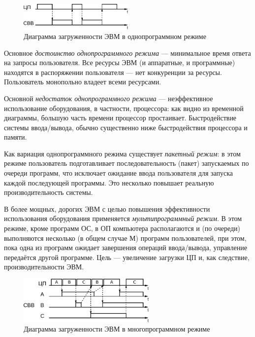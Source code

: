 \documentclass[unicode, 12pt, a4paper, oneside]{article}
\begin{document}
\begin{figure}[H]
\centering
\includegraphics[width=0.5\textwidth]{153_single.pdf}
\caption{Диаграмма загруженности ЭВМ в однопрограммном режиме}
\end{figure}

Основное \textit{достоинство однопрограммного режима} --- минимальное время ответа на запросы пользователя. Все ресурсы ЭВМ (и аппаратные, и программные) находятся в распоряжении пользователя --- нет конкуренции за ресурсы. Пользователь монопольно владеет всеми ресурсами.

Основной \textit{недостаток однопрограммного режима} --- неэффективное использование оборудования, в частности, процессора: как видно из временной диаграммы, большую часть времени процессор простаивает.  Быстродействие системы ввода/вывода, обычно существенно ниже быстродействия процессора и памяти.

Как вариация однопрограммного режима существует \textit{пакетный режим}: в этом режиме пользователь подготавливает последовательность (пакет) запускаемых по очереди программ, что исключает ожидание ввода пользователя для запуска каждой последующей программы. Это несколько повышает реальную производительность системы.

В более мощных, дорогих ЭВМ с целью повышения эффективности использования оборудования применяется \textit{мультипрограммный режим}. В этом режиме, кроме программ ОС, в ОП компьютера располагаются и (по очереди) выполняются несколько (в общем случае М) программ пользователей, при этом, пока одна из программ ожидает завершения операций ввода/вывода, управление передаётся другой программе. Цель --- увеличение загрузки ЦП и, как следствие, производительности ЭВМ.

\begin{figure}[H]
\centering
\includegraphics[width=0.6\textwidth]{153_multi.pdf}
\caption{Диаграмма загруженности ЭВМ в многопрограммном режиме}
\end{figure}
\end{document}
